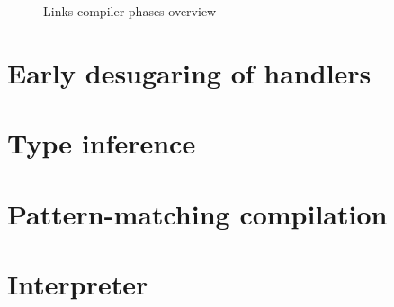 \begin{figure}[H]
\begin{center}


\caption{Links compiler phases overview}\label{fig:compiler-phases}
\end{center}
\end{figure}
\section{Early desugaring of handlers}
\section{Type inference}
\section{Pattern-matching compilation}
\section{Interpreter}
